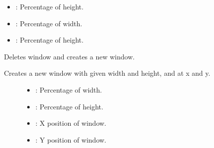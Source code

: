 \documentclass[letterpaper,10pt,english]{sphinxmanual}
\begin{document}
\begin{fulllineitems}
\begin{fulllineitems}
\begin{description}
\begin{itemize}
\item {} 
: Percentage of height. 

\item {} 
: Percentage of width. 

\item {} 
: Percentage of height. 

\end{itemize}

\end{description}


\end{fulllineitems}


\begin{fulllineitems}
\label{\detokenize{index:_CPPv2N7ostendo6Window9NewWindowEddii}}%
\pysigstartmultiline
{}\label{\detokenize{index:Pessumclassostendo_1_1Window_1a12e3cedcaa35c674e2de4a35e9f6ae48}}%
\pysigstopmultiline
Deletes window and creates a new window. 

Creates a new window with given width and height, and at x and y. \begin{description}
\item[{}] \leavevmode
{\hyperref[\detokenize{index:Pessumnamespaceostendo_1a4c5850c8a109e159e874ecce8a5dc62a}]{}} 

\item[{}] \leavevmode\begin{itemize}
\item {} 
: Percentage of width. 

\item {} 
: Percentage of height. 

\item {} 
: X position of window. 

\item {} 
: Y position of window. 

\end{itemize}

\end{description}



\end{fulllineitems}
\end{fulllineitems}
\end{document}
